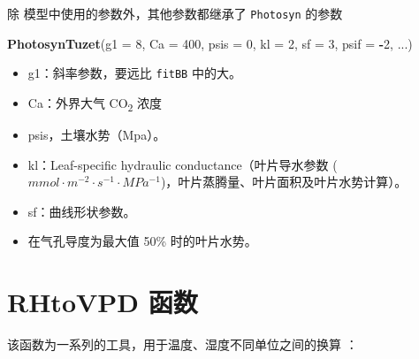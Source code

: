 \documentclass[]{krantz}
\makeatletter
\newenvironment{Shaded}{\begin{snugshade}}{\end{snugshade}}
\newcommand{\KeywordTok}[1]{\textcolor[rgb]{0.13,0.29,0.53}{\textbf{#1}}}
\newcommand{\DataTypeTok}[1]{\textcolor[rgb]{0.13,0.29,0.53}{#1}}
\newcommand{\DecValTok}[1]{\textcolor[rgb]{0.00,0.00,0.81}{#1}}
\newcommand{\OperatorTok}[1]{\textcolor[rgb]{0.81,0.36,0.00}{\textbf{#1}}}
\newcommand{\NormalTok}[1]{#1}
\providecommand{\tightlist}{%
  \setlength{\itemsep}{0pt}\setlength{\parskip}{0pt}}
\newenvironment{kframe}{%
\medskip{}
\setlength{\fboxsep}{.8em}
 \def\at@end@of@kframe{}%
 \ifinner\ifhmode%
  \def\at@end@of@kframe{\end{minipage}}%
  \begin{minipage}{\columnwidth}%
 \fi\fi%
 \def\FrameCommand##1{\hskip\@totalleftmargin \hskip-\fboxsep
 \colorbox{shadecolor}{##1}\hskip-\fboxsep
     \hskip-\linewidth \hskip-\@totalleftmargin \hskip\columnwidth}%
 \MakeFramed {\advance\hsize-\width
   \@totalleftmargin\z@ \linewidth\hsize
   \@setminipage}}%
 {\par\unskip\endMakeFramed%
 \at@end@of@kframe}
\renewenvironment{Shaded}{\begin{kframe}}{\end{kframe}}
\theoremstyle{definition}
\theoremstyle{definition}
\theoremstyle{definition}
\theoremstyle{remark}
\makeatother
\begin{document}
除 \citet{tuzet2003a} 模型中使用的参数外，其他参数都继承了
\texttt{Photosyn} 的参数

\begin{Shaded}
\begin{Highlighting}[]
\KeywordTok{PhotosynTuzet}\NormalTok{(}\DataTypeTok{g1 =} \DecValTok{8}\NormalTok{, }\DataTypeTok{Ca =} \DecValTok{400}\NormalTok{, }\DataTypeTok{psis =} \DecValTok{0}\NormalTok{,}
              \DataTypeTok{kl =} \DecValTok{2}\NormalTok{, }\DataTypeTok{sf =} \DecValTok{3}\NormalTok{, }\DataTypeTok{psif =} \OperatorTok{-}\DecValTok{2}\NormalTok{,}
\NormalTok{...)}
\end{Highlighting}
\end{Shaded}

\begin{itemize}
\tightlist
\item
  g1：斜率参数，要远比 \texttt{fitBB} 中的大。
\item
  Ca：外界大气 CO\textsubscript{2} 浓度
\item
  psis，土壤水势（Mpa）。
\item
  kl：Leaf-speciﬁc hydraulic conductance（叶片导水参数
  (\(mmol \cdot m^{-2} \cdot s^{-1} \cdot MPa^{-1}\))，叶片蒸腾量、叶片面积及叶片水势计算）。
\item
  sf：曲线形状参数。
\item
  在气孔导度为最大值 50\% 时的叶片水势。
\end{itemize}

\cleardoublepage

\chapter{RHtoVPD 函数}\label{rhtovpd}

该函数为一系列的工具，用于温度、湿度不同单位之间的换算
\citet{Jones1993Plants} ：
\end{document}
